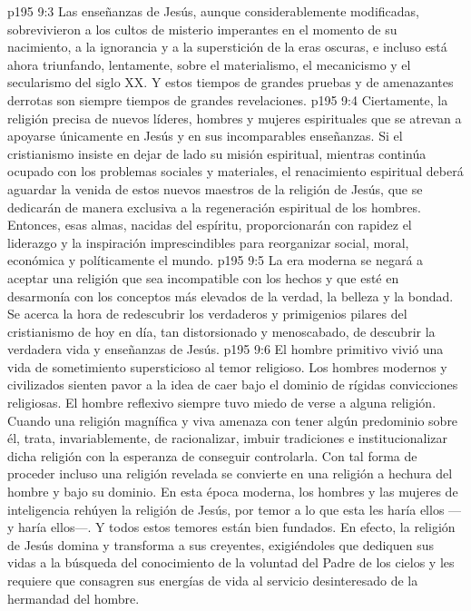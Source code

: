 \vs p195 9:3 Las enseñanzas de Jesús, aunque considerablemente modificadas, sobrevivieron a los cultos de misterio imperantes en el momento de su nacimiento, a la ignorancia y a la superstición de la eras oscuras, e incluso está ahora triunfando, lentamente, sobre el materialismo, el mecanicismo y el secularismo del siglo XX. Y estos tiempos de grandes pruebas y de amenazantes derrotas son siempre tiempos de grandes revelaciones.
\vs p195 9:4 \pc Ciertamente, la religión precisa de nuevos líderes, hombres y mujeres espirituales que se atrevan a apoyarse únicamente en Jesús y en sus incomparables enseñanzas. Si el cristianismo insiste en dejar de lado su misión espiritual, mientras continúa ocupado con los problemas sociales y materiales, el renacimiento espiritual deberá aguardar la venida de estos nuevos maestros de la religión de Jesús, que se dedicarán de manera exclusiva a la regeneración espiritual de los hombres. Entonces, esas almas, nacidas del espíritu, proporcionarán con rapidez el liderazgo y la inspiración imprescindibles para reorganizar social, moral, económica y políticamente el mundo.
\vs p195 9:5 La era moderna se negará a aceptar una religión que sea incompatible con los hechos y que esté en desarmonía con los conceptos más elevados de la verdad, la belleza y la bondad. Se acerca la hora de redescubrir los verdaderos y primigenios pilares del cristianismo de hoy en día, tan distorsionado y menoscabado, de descubrir la verdadera vida y enseñanzas de Jesús.
\vs p195 9:6 \pc El hombre primitivo vivió una vida de sometimiento supersticioso al temor religioso. Los hombres modernos y civilizados sienten pavor a la idea de caer bajo el dominio de rígidas convicciones religiosas. El hombre reflexivo siempre tuvo miedo de verse  a alguna religión. Cuando una religión magnífica y viva amenaza con tener algún predominio sobre él, trata, invariablemente, de racionalizar, imbuir tradiciones e institucionalizar dicha religión con la esperanza de conseguir controlarla. Con tal forma de proceder incluso una religión revelada se convierte en una religión a hechura del hombre y bajo su dominio. En esta época moderna, los hombres y las mujeres de inteligencia rehúyen la religión de Jesús, por temor a lo que esta les haría  ellos ---y haría  ellos---. Y todos estos temores están bien fundados. En efecto, la religión de Jesús domina y transforma a sus creyentes, exigiéndoles que dediquen sus vidas a la búsqueda del conocimiento de la voluntad del Padre de los cielos y les requiere que consagren sus energías de vida al servicio desinteresado de la hermandad del hombre.
